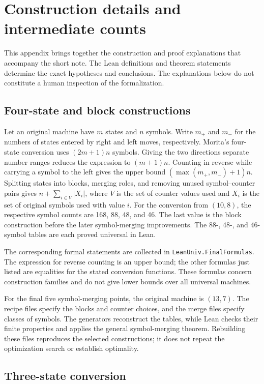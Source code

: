 \section{Construction details and intermediate counts}

This appendix brings together the construction and proof explanations that
accompany the short note. The Lean definitions and theorem statements determine
the exact hypotheses and conclusions. The explanations below do not constitute
a human inspection of the formalization.

\subsection{Four-state and block constructions}

Let an original machine have $m$ states and $n$ symbols. Write $m_+$ and $m_-$
for the numbers of states entered by right and left moves, respectively.
Morita's four-state conversion uses $(2m+1)n$ symbols. Giving the two directions
separate number ranges reduces the expression to $(m+1)n$.
Counting in reverse while carrying a symbol to the left gives the upper bound
$(\max(m_+,m_-)+1)n$.
Splitting states into blocks, merging roles, and removing unused
symbol--counter pairs gives $n+\sum_{i\in V}|X_i|$, where $V$ is the set of
counter values used and $X_i$ is the set of original symbols used with value $i$.
For the conversion from $(10,8)$, the respective symbol counts are 168, 88,
48, and 46. The last value is the block construction before the later
symbol-merging improvements. The 88-, 48-, and 46-symbol tables are each
proved universal in Lean.

The corresponding formal statements are collected in
\texttt{LeanUniv.FinalFormulas}. The expression for reverse counting is an
upper bound; the other formulas just listed are equalities for the stated
conversion functions. These formulas concern construction families and do
not give lower bounds over all universal machines.

For the final five symbol-merging points, the original machine is $(13,7)$.
The recipe files specify the blocks and counter choices, and the merge files
specify classes of symbols. The generators reconstruct the tables, while
Lean checks their finite properties and applies the general symbol-merging
theorem. Rebuilding these files reproduces the selected constructions; it
does not repeat the optimization search or establish optimality.

\subsection{Three-state conversion}

